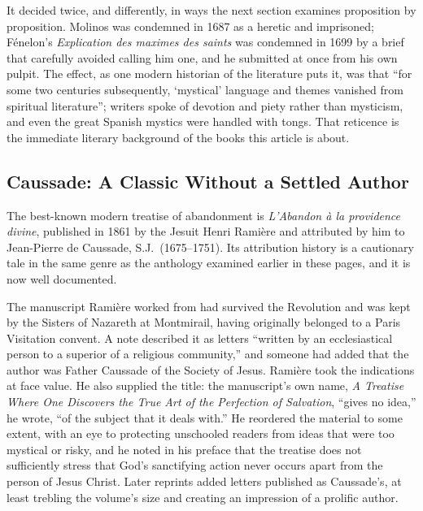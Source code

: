 It decided twice, and differently, in ways the next section examines proposition by proposition. Molinos was condemned in 1687 as a heretic and imprisoned; Fénelon's \emph{Explication des maximes des saints} was condemned in 1699 by a brief that carefully avoided calling him one, and he submitted at once from his own pulpit. The effect, as one modern historian of the literature puts it, was that ``for some two centuries subsequently, `mystical' language and themes vanished from spiritual literature''; writers spoke of devotion and piety rather than mysticism, and even the great Spanish mystics were handled with tongs. That reticence is the immediate literary background of the books this article is about.

\subsection{Caussade: A Classic Without a Settled Author}

The best-known modern treatise of abandonment is \emph{L'Abandon à la providence divine}, published in 1861 by the Jesuit Henri Ramière and attributed by him to Jean-Pierre de Caussade, S.J.\ (1675--1751). Its attribution history is a cautionary tale in the same genre as the anthology examined earlier in these pages, and it is now well documented.

The manuscript Ramière worked from had survived the Revolution and was kept by the Sisters of Nazareth at Montmirail, having originally belonged to a Paris Visitation convent. A note described it as letters ``written by an ecclesiastical person to a superior of a religious community,'' and someone had added that the author was Father Caussade of the Society of Jesus. Ramière took the indications at face value. He also supplied the title: the manuscript's own name, \emph{A Treatise Where One Discovers the True Art of the Perfection of Salvation}, ``gives no idea,'' he wrote, ``of the subject that it deals with.'' He reordered the material to some extent, with an eye to protecting unschooled readers from ideas that were too mystical or risky, and he noted in his preface that the treatise does not sufficiently stress that God's sanctifying action never occurs apart from the person of Jesus Christ. Later reprints added letters published as Caussade's, at least trebling the volume's size and creating an impression of a prolific author.

